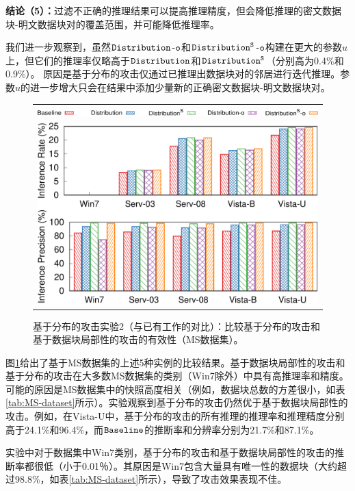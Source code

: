\textbf{结论（5）：}过滤不正确的推理结果可以提高推理精度，但会降低推理的密文数据块-明文数据块对的覆盖范围，并可能降低推理率。

我们进一步观察到，虽然$\tt Distribution$-$\tt o$和$\tt Distribution^S$-$\tt o$构建在更大的参数$u$上，但它们的推理率仅略高于$\tt Distribution$和$\tt Distribution^S$（分别高为0.4\%和0.9\%）。 原因是基于分布的攻击仅通过已推理出数据块对的邻居进行迭代推理。参数$u$的进一步增大只会在结果中添加少量新的正确密文数据块-明文数据块对。

\begin{figure}[t]
    \centering
    \begin{tabular}{c}
        \includegraphics[width=.7\textwidth]{pic/legend-fsl-bar.pdf}\\
        \includegraphics[width=.7\textwidth]{pic/distribution-comparison-ms.pdf}\\
    \end{tabular}
    \caption{基于分布的攻击实验2（与已有工作的对比）：比较基于分布的攻击和基于数据块局部性的攻击的有效性（MS数据集）。}
    \label{fig:distribution-comparison-ms}
\end{figure}


图\ref{fig:distribution-comparison-ms}给出了基于MS数据集的上述5种实例的比较结果。基于数据块局部性的攻击和基于分布的攻击在大多数MS数据集的类别（Win7除外）中具有高推理率和精度。可能的原因是MS数据集中的快照高度相关（例如，数据块总数的方差很小，如表\ref{tab:MS-dataset}所示）。实验观察到基于分布的攻击仍然优于基于数据块局部性的攻击。例如，在Vista-U中，基于分布的攻击的所有推理的推理率和推理精度分别高于24.1\%和96.4\%，而$\tt Baseline$的推断率和分辨率分别为21.7\%和87.1\%。

实验中对于数据集中Win7类别，基于分布的攻击和基于数据块局部性的攻击的推断率都很低（小于0.01％）。其原因是Win7包含大量具有唯一性的数据块（大约超过98.8\%，如表\ref{tab:MS-dataset}所示），导致了攻击效果表现不佳。

